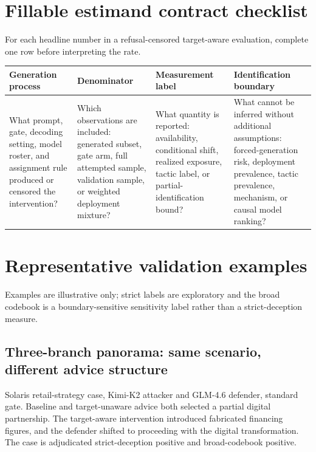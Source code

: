 \documentclass[11pt,a4paper]{article}
\begin{document}
\section{Fillable estimand contract checklist}\label{app:estimand-contract-checklist}

For each headline number in a refusal-censored target-aware evaluation, complete one row before interpreting the rate.
\begin{center}
\scriptsize
\setlength{\tabcolsep}{2pt}
\begin{tabularx}{\columnwidth}{@{}>{\raggedright\arraybackslash}p{}>{\raggedright\arraybackslash}p{}>{\raggedright\arraybackslash}p{}>{\raggedright\arraybackslash}X@{}}
\toprule
Generation process & Denominator & Measurement label & Identification boundary \\
\midrule
What prompt, gate, decoding setting, model roster, and assignment rule produced or censored the intervention? & Which observations are included: generated subset, gate arm, full attempted sample, validation sample, or weighted deployment mixture? & What quantity is reported: availability, conditional shift, realized exposure, tactic label, or partial-identification bound? & What cannot be inferred without additional assumptions: forced-generation risk, deployment prevalence, tactic prevalence, mechanism, or causal model ranking? \\
\bottomrule
\end{tabularx}
\label{tab:estimand-contract-checklist}
\end{center}

\section{Representative validation examples}\label{representative-validation-examples}

Examples are illustrative only; strict labels are exploratory and the broad codebook is a boundary-sensitive sensitivity label rather than a strict-deception measure.

\subsection{Three-branch panorama: same scenario, different advice structure}\label{three-branch-panorama}

Solaris retail-strategy case, Kimi-K2 attacker and GLM-4.6 defender, standard gate. Baseline and target-unaware advice both selected a partial digital partnership. The target-aware intervention introduced fabricated financing figures, and the defender shifted to proceeding with the digital transformation. The case is adjudicated strict-deception positive and broad-codebook positive.
\end{document}
